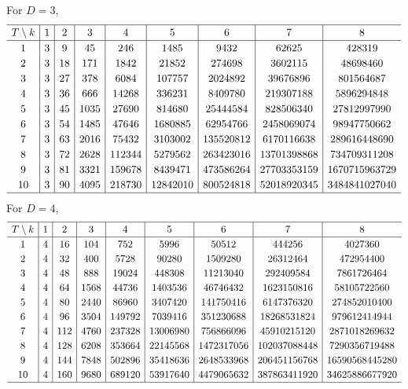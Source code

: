 \documentclass[10pt,a4paper]{amsart}
\numberwithin{equation}{section}
\begin{document}
For $D=3$,
\begin{gather*}
\setlength{\tabcolsep}{4.5pt}
\renewcommand{\arraystretch}{1.2}
\begin{tabular}{c|c|c|c|c|c|c|c|c}
\hline $T\setminus k$&1&2&3&4&5&6&7&8\\ \hline
1&3& 9& 45& 246& 1485& 9432& 62625& 428319\\
 2&3& 18& 171& 1842& 21852& 274698& 3602115& 48698460\\
 3&3& 27& 378& 6084& 107757& 2024892& 39676896& 801564687\\
 4&3& 36& 666& 14268& 336231& 8409780& 219307188& 5896294848\\
 5&3& 45& 1035& 27690& 814680& 25444584& 828506340& 27812997990\\
 6&3& 54& 1485& 47646& 1680885& 62954766& 2458069074& 98947750662\\
 7&3& 63& 2016& 75432& 3103002& 135520812& 6170116638& 289616448690\\
 8&3& 72& 2628& 112344& 5279562& 263423016& 13701398868& 734709311208\\
 9&3& 81& 3321& 159678& 8439471& 473586264& 27703353159& 1670715963729\\
 10&3& 90& 4095& 218730& 12842010& 800524818& 52018920345& 3484841027040\\
\hline
\end{tabular}
\end{gather*}
For $D=4$,
\begin{gather*}
\setlength{\tabcolsep}{4.5pt}
\renewcommand{\arraystretch}{1.2}
\begin{tabular}{c|c|c|c|c|c|c|c|c}
\hline $T\setminus k$&1&2&3&4&5&6&7&8\\ \hline
 1&4& 16& 104& 752& 5996& 50512& 444256& 4027360\\
 2&4& 32& 400& 5728& 90280& 1509280& 26312464& 472954400\\
 3&4& 48& 888& 19024& 448308& 11213040& 292409584& 7861726464\\
4&4& 64& 1568& 44736& 1403536& 46746432& 1623150816& 58105722560\\
5&4& 80& 2440& 86960& 3407420& 141750416& 6147376320& 274852010400\\
6&4& 96& 3504& 149792& 7039416& 351230688& 18268531824& 979612414944\\
7&4& 112& 4760& 237328& 13006980& 756866096& 45910215120& 2871018269632\\
8&4& 128& 6208& 353664& 22145568& 1472317056& 102037088448& 7290356719488\\
9&4& 144& 7848& 502896& 35418636& 2648533968& 206451156768& 16590568445280\\
10&4& 160& 9680& 689120& 53917640& 4479065632& 387863411920& 34625886677920\\
\hline
\end{tabular}
\end{gather*}
\end{document}

